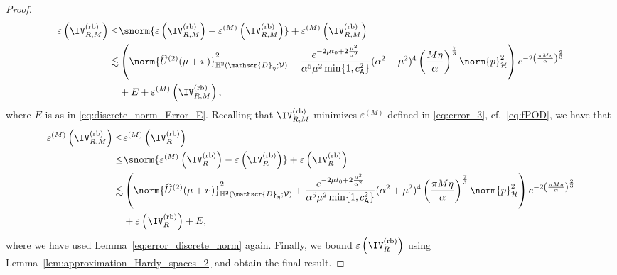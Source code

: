 \begin{proof}
\begin{equation}
\begin{aligned}
	\varepsilon
	\left(
		\IV^{\normalfont\text{(rb)}}_{R,M}
	\right)
	\leq
	&
	\snorm{
      	\varepsilon
      	\left(
      		\IV^{\normalfont\text{(rb)}}_{R,M}
      	\right)
		-
		\varepsilon^{(M)}
		\left(
			\IV^{\normalfont\text{(rb)}}_{R,M}
		\right)
	}
	+
	\varepsilon^{(M)}
	\left(
		\IV^{\normalfont\text{(rb)}}_{R,M}
	\right)
	\\
	\lesssim
	&
    \left(
       	\norm{
    			\widehat{U}^{(2)}(\mu+\imath \cdot) 
    		}^2_{\mathbb{H}^2(\mathscr{D}_\eta;\mathcal{V})}
        +
		\frac{e^{-2\mu t_0+2\frac{\mu^2}{\alpha^2}}}{\alpha^5 \mu^2 \min\{1, c^2_{\mathsf{A}}\}}
    		(\alpha^2+\mu^2)^4
    		\left(\frac{M \eta}{\alpha} \right)^\frac{7}{3}
	\norm{p}^2_{\mathcal{H}}\right)
	e^{-2 \left(\frac{\pi M \eta}{\alpha} \right)^{\frac{2}{3}}}
    \\
    &
    +
    E
	+
	\varepsilon^{(M)}
	\left(
		\IV^{\normalfont\text{(rb)}}_{R,M}
	\right),
\end{aligned}
\end{equation}
where $E$ is as in \eqref{eq:discrete_norm_Error_E}.
%
Recalling that $\IV^{\normalfont\text{(rb)}}_{R,M}$ minimizes
$\varepsilon^{(M)}$ defined in \eqref{eq:error_3}, cf.~\eqref{eq:fPOD},
we have that
\begin{equation}
\begin{aligned}
	\varepsilon^{(M)}\left(\IV^{\normalfont\text{(rb)}}_{R,M}\right)
	\leq
    &
	\varepsilon^{(M)}\left(\IV^{\normalfont\text{(rb)}}_{R}\right)
	\\
	\leq
    &
	\snorm{
		\varepsilon^{(M)}\left(\IV^{\normalfont\text{(rb)}}_{R}\right)
		-
		\varepsilon\left(\IV^{\normalfont\text{(rb)}}_{R}\right)
	}
	+
	\varepsilon\left(\IV^{\normalfont\text{(rb)}}_{R}\right)
	\\
	\lesssim
	&
    \left(
       	\norm{
    			\widehat{U}^{(2)}(\mu+\imath \cdot) 
    		}^2_{\mathbb{H}^2(\mathscr{D}_\eta;\mathcal{V})}
        +
		\frac{e^{-2\mu t_0+2\frac{\mu^2}{\alpha^2}}}{\alpha^5 \mu^2 \min\{1, c^2_{\mathsf{A}}\}}
    		(\alpha^2+\mu^2)^4
    		\left(\frac{\pi M \eta}{\alpha} \right)^\frac{7}{3}
            \norm{p}^2_{\mathcal{H}}
	\right)
	e^{-2 \left(\frac{\pi M \eta}{\alpha} \right)^{\frac{2}{3}}}
    \\
    &
	+
	\varepsilon
	\left(
		\IV^{\normalfont\text{(rb)}}_{R}
	\right) + E,
\end{aligned}
\end{equation}
where we have used Lemma~\ref{eq:error_discrete_norm} again.
Finally, we bound
$\varepsilon\left(\IV^{\normalfont\text{(rb)}}_{R}\right)$ using Lemma~\ref{lem:approximation_Hardy_spaces_2} and obtain the final result.
\end{proof}

